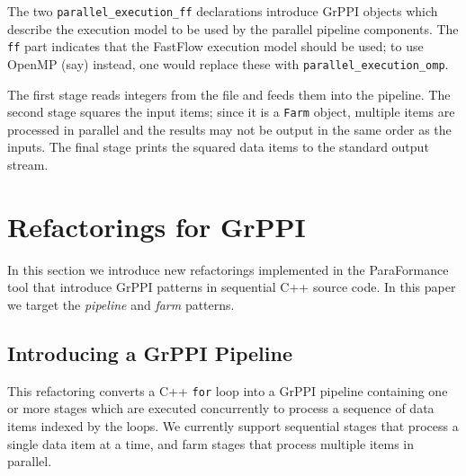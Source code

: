 The two \verb|parallel_execution_ff| declarations introduce GrPPI
objects which describe the execution model to be used by 
the parallel pipeline components.  The \verb|ff| part indicates that
the FastFlow execution model should be used; to use OpenMP (say)
instead, one would replace these with \verb|parallel_execution_omp|.

The first stage reads integers from the file and feeds them into the pipeline.
The second stage squares the input items; since it is a \verb|Farm| object,
multiple items are processed in parallel and the results may not be output
in the same order as the inputs.
The final stage prints the squared data items to the standard output stream.


\section{Refactorings for GrPPI}
\label{refactoring_grppi}

In this section we introduce new refactorings implemented in the ParaFormance tool that introduce GrPPI patterns in sequential C++ source code. In this paper we target the \emph{pipeline} and \emph{farm} patterns.

\subsection{Introducing a GrPPI Pipeline}\label{refactoring-interface}

This refactoring converts a C++
\texttt{for} loop into a GrPPI pipeline containing one or more stages
which are executed concurrently to process a sequence of data items
indexed by the loops. We currently support sequential stages that
process a single data item at a time, and farm stages that process
multiple items in parallel. 


